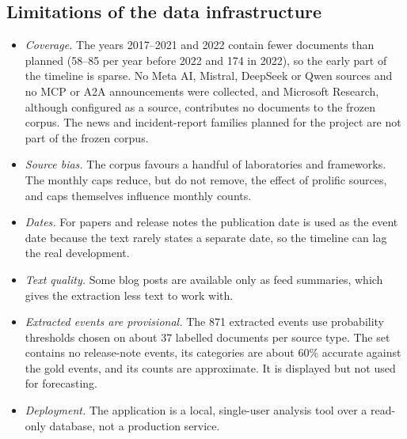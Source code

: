 \documentclass[11pt,a4paper]{article}
\begin{document}
\subsection{Limitations of the data infrastructure}
\label{sec:limits}
\begin{itemize}
\item \emph{Coverage.} The years 2017--2021 and 2022 contain fewer documents than planned (58--85 per year before
2022 and 174 in 2022), so the early part of the timeline is sparse. No Meta AI, Mistral, DeepSeek or Qwen sources and no
MCP or A2A announcements were collected, and Microsoft Research, although configured as a source, contributes no
documents to the frozen corpus. The news and incident-report families
planned for the project are not part of the frozen corpus.
\item \emph{Source bias.} The corpus favours a handful of laboratories and frameworks. The monthly caps reduce,
but do not remove, the effect of prolific sources, and caps themselves influence monthly counts.
\item \emph{Dates.} For papers and release notes the publication date is used as the event date because the
text rarely states a separate date, so the timeline can lag the real development.
\item \emph{Text quality.} Some blog posts are available only as feed summaries, which gives the extraction less
text to work with.
\item \emph{Extracted events are provisional.} The 871 extracted events use probability thresholds chosen on
about 37 labelled documents per source type. The set contains no release-note events, its categories are about
60\% accurate against the gold events, and its counts are approximate. It is displayed but not used for
forecasting.
\item \emph{Deployment.} The application is a local, single-user analysis tool over a read-only database, not a
production service.
\end{itemize}
\end{document}
